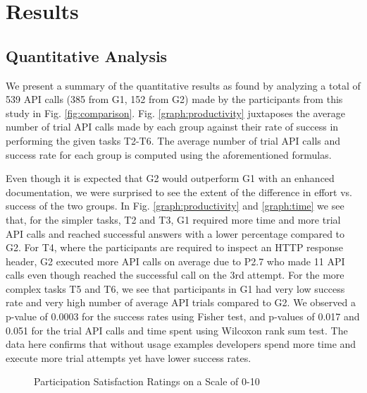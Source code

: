 \documentclass[conference]{IEEEtran}
\begin{document}
\section{Results}
\label{sec:results}


\subsection{Quantitative Analysis} %


We present a summary of the quantitative results as found by analyzing a total of 539 API calls (385 from G1, 152 from G2) made by the participants from this study in Fig. \ref{fig:comparison}. Fig. \ref{graph:productivity} juxtaposes the average number of trial API calls made by each group against their rate of success in performing the given tasks T2-T6. The average number of trial API calls and success rate for each group is computed using the aforementioned formulas.

Even though it is expected that G2 would outperform G1 with an enhanced documentation, we were surprised to see the extent of the difference in effort vs. success of the two groups. In Fig. \ref{graph:productivity} and \ref{graph:time} we see that, for the simpler tasks, T2 and T3, G1 required more time and more trial API calls and reached successful answers with a lower percentage compared to G2. For T4, where the participants are required to inspect an HTTP response header, G2 executed more API calls on average due to P2.7 who made 11 API calls even though reached the successful call on the 3rd attempt. For the more complex tasks T5 and T6, we see that participants in G1 had very low success rate and very high number of average API trials compared to G2. We observed a p-value of 0.0003 for the success rates using Fisher test, and p-values of 0.017  and 0.051 for the trial API calls and time spent using Wilcoxon rank sum test. The data here confirms that without usage examples developers spend more time and execute more trial attempts yet have lower success rates.

\begin{figure}[h]
\centering

\caption{Participation Satisfaction Ratings on a Scale of 0-10}
\label{fig:rating}

\end{figure}
\end{document}
